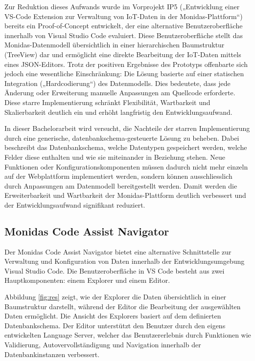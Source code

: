 Zur Reduktion dieses Aufwands wurde im Vorprojekt IP5 („Entwicklung einer VS-Code Extension zur Verwaltung von IoT-Daten in der Monidas-Plattform“) bereits ein Proof-of-Concept entwickelt, der eine alternative Benutzeroberfläche innerhalb von Visual Studio Code evaluiert. Diese Benutzeroberfläche stellt das Monidas-Datenmodell übersichtlich in einer hierarchischen Baumstruktur (TreeView) dar und ermöglicht eine direkte Bearbeitung der IoT-Daten mittels eines JSON-Editors. Trotz der positiven Ergebnisse des Prototyps offenbarte sich jedoch eine wesentliche Einschränkung: Die Lösung basierte auf einer statischen Integration („Hardcodierung“) des Datenmodells. Dies bedeutete, dass jede Änderung oder Erweiterung manuelle Anpassungen am Quellcode erforderte. Diese starre Implementierung schränkt Flexibilität, Wartbarkeit und Skalierbarkeit deutlich ein und erhöht langfristig den Entwicklungsaufwand.

In dieser Bachelorarbeit wird versucht, die Nachteile der starren Implementierung durch eine generische, datenbankschema-gesteuerte Lösung zu beheben. Dabei beschreibt das Datenbankschema, welche Datentypen gespeichert werden, welche Felder diese enthalten und wie sie miteinander in Beziehung stehen. Neue Funktionen oder Konfigurationskomponenten müssen dadurch nicht mehr einzeln auf der Webplattform implementiert werden, sondern können ausschliesslich durch Anpassungen am Datenmodell bereitgestellt werden. Damit werden die Erweiterbarkeit und Wartbarkeit der Monidas-Plattform deutlich verbessert und der Entwicklungsaufwand signifikant reduziert.

\newpage
\subsection{Monidas Code Assist Navigator}
Der Monidas Code Assist Navigator bietet eine alternative Schnittstelle zur Verwaltung und Konfiguration von Daten innerhalb der Entwicklungsumgebung Visual Studio Code. Die Benutzeroberfläche in VS Code besteht aus zwei Hauptkomponenten: einem Explorer und einem Editor.

Abbildung \ref{fig:res} zeigt, wie der Explorer die Daten übersichtlich in einer Baumstruktur darstellt, während der Editor die Bearbeitung der ausgewählten Daten ermöglicht. Die Ansicht des Explorers basiert auf dem definierten Datenbankschema. Der Editor unterstützt den Benutzer durch den eigens entwickelten Language Server, welcher das Benutzererlebnis durch Funktionen wie Validierung, Autovervollständigung und Navigation innerhalb der Datenbankinstanzen verbessert.


